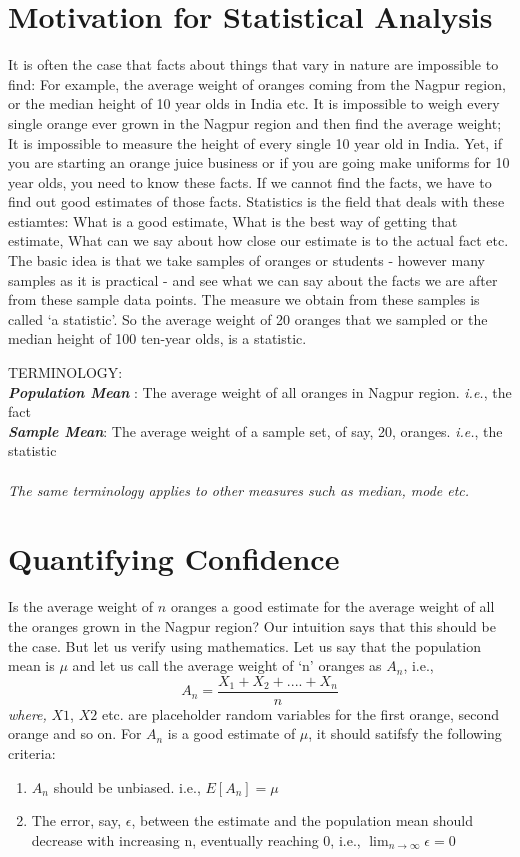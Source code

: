 \section{Motivation for Statistical Analysis}
It is often the case that facts about things that vary in nature are impossible to find: For example, the average weight of oranges coming from the Nagpur region, or the median height of 10 year olds in India etc. It is impossible to weigh every single orange ever grown in the Nagpur region and then find the average weight; It is impossible to measure the height of every single 10 year old in India. Yet, if you are starting an orange juice business or if you are going make uniforms for 10 year olds, you need to know these facts. If we cannot find the facts, we have to find out good estimates of those facts. Statistics is the field that deals with these estiamtes: What is a good estimate, What is the best way of getting that estimate, What can we say about how close our estimate is to the actual fact etc. The basic idea is that we take samples of oranges or students - however many samples as it is practical - and see what we can say about the facts we are after from these sample data points. The measure we obtain from these samples is called `a statistic'. So the average weight of 20 oranges that we sampled or the median height of 100 ten-year olds, is a statistic. \\ 

	\begin{highlightedText}
		TERMINOLOGY: \\
		\emph{\textbf{Population Mean}} :  The average weight of all oranges in Nagpur region. \emph{i.e.}, the fact\\
		\emph{\textbf{Sample Mean}}:  The average weight of a sample set, of say, 20, oranges. \emph{i.e.}, the statistic \\ \\
		\emph{The same terminology applies to other measures such as median, mode etc.}
	\end{highlightedText}
	
\section{Quantifying Confidence}
Is the average weight of $n$ oranges a good estimate for the average weight of all the oranges grown in the Nagpur region? Our intuition says that this should be the case. But let us verify using mathematics. Let us say that the population mean is $\mu$ and let us call the average weight of `n' oranges as $A_n$, i.e., \[A_n = \frac{X_1+X_2+....+X_n}{n} \] \emph{where,} $X1$, $X2$ etc. are placeholder random variables for the first orange, second orange and so on. For $A_n$ is a good estimate of $\mu$, it should satifsfy the following criteria:
\begin{enumerate}
	\item $A_n$ should be unbiased. i.e., $E[A_n] = \mu $
	\item The error, say, $\epsilon$, between the estimate and the population mean should decrease with increasing n, eventually reaching 0, i.e., $\lim_{n\to\infty} \epsilon = 0 $
\end{enumerate}

